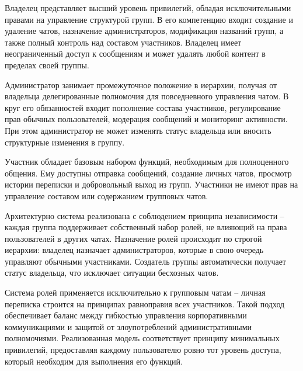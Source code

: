 Владелец представляет высший уровень привилегий, обладая исключительными правами на управление структурой групп. В его компетенцию входит создание и удаление чатов, назначение администраторов, модификация названий групп, а также полный контроль над составом участников. Владелец имеет неограниченный доступ к сообщениям и может удалять любой контент в пределах своей группы.

Администратор занимает промежуточное положение в иерархии, получая от владельца делегированные полномочия для повседневного управления чатом. В круг его обязанностей входит пополнение состава участников, регулирование прав обычных пользователей, модерация сообщений и мониторинг активности. При этом администратор не может изменять статус владельца или вносить структурные изменения в группу.

Участник обладает базовым набором функций, необходимым для полноценного общения. Ему доступны отправка сообщений, создание личных чатов, просмотр истории переписки и добровольный выход из групп. Участники не имеют прав на управление составом или содержанием групповых чатов.

Архитектурно система реализована с соблюдением принципа независимости – каждая группа поддерживает собственный набор ролей, не влияющий на права пользователей в других чатах. Назначение ролей происходит по строгой иерархии: владелец назначает администраторов, которые в свою очередь управляют обычными участниками. Создатель группы автоматически получает статус владельца, что исключает ситуации бесхозных чатов.

Система ролей применяется исключительно к групповым чатам – личная переписка строится на принципах равноправия всех участников. Такой подход обеспечивает баланс между гибкостью управления корпоративными коммуникациями и защитой от злоупотреблений административными полномочиями. Реализованная модель соответствует принципу минимальных привилегий, предоставляя каждому пользователю ровно тот уровень доступа, который необходим для выполнения его функций.

